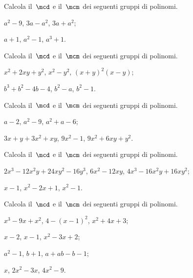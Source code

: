 \begin{esercizio}[\Ast]
\label{ese:18.5}
Calcola il~$\mcd$ e il~$\mcm$ dei seguenti gruppi di polinomi.
\begin{multicols}{2}
\begin{enumeratea}
 \item $a^{2}-9$, $3a-a^{2}$, $3a+a^{2}$;
 \item $a+1$, $a^{2}-1$, $a^{3}+1$.
\end{enumeratea}
\end{multicols}
\end{esercizio}

\begin{esercizio}[\Ast]
\label{ese:18.6}
Calcola il~$\mcd$ e il~$\mcm$ dei seguenti gruppi di polinomi.
\begin{multicols}{2}
\begin{enumeratea}
 \item $x^{2}+2xy+y^{2}$, $x^{2}-y^{2}$, $(x+y)^{2}(x-y)$;
 \item $b^{3}+b^{2}-4b-4$, $b^{2}-a$, $b^{2}-1$.
\end{enumeratea}
\end{multicols}
\end{esercizio}

\begin{esercizio}[\Ast]
\label{ese:18.7}
Calcola il~$\mcd$ e il~$\mcm$ dei seguenti gruppi di polinomi.
\begin{enumeratea}
 \item $a-2$, $a^{2}-9$, $a^{2}+a-6$;
 \item $3x+y+3x^{2}+xy$, $9x^{2}-1$, $9x^{2}+6xy+y^{2}$.
\end{enumeratea}
\end{esercizio}

\begin{esercizio}[\Ast]
\label{ese:18.8}
Calcola il~$\mcd$ e il~$\mcm$ dei seguenti gruppi di polinomi.
\begin{enumeratea}
 \item $2x^{3}-12x^{2}y+24xy^{2}-16y^{3}$, $6x^{2}-12xy$, $4x^{3}-16x^{2}y+16xy^{2}$;
 \item $x-1$, $x^{2}-2x+1$, $x^{2}-1$.%
\end{enumeratea}
\end{esercizio}

\begin{esercizio}
\label{ese:18.9}
Calcola il~$\mcd$ e il~$\mcm$ dei seguenti gruppi di polinomi.
\begin{multicols}{2}
\begin{enumeratea}
 \item $x^{3}-9x+x^{2}$, $4-(x-1)^{2}$, $x^{2}+4x+3$;
 \item $x-2$, $x-1$, $x^{2}-3x+2$;
 \item $a^{2}-1$, $b+1$, $a+ab-b-1$;
 \item $x$, $2x^{2}-3x$, $4x^{2}-9$.
\end{enumeratea}
\end{multicols}
\end{esercizio}

